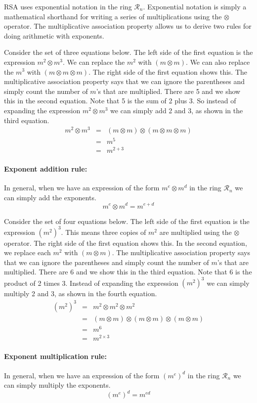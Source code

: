 
RSA uses exponential notation in the ring $\mathcal{R}_n$.
Exponential notation is simply a mathematical shorthand for writing 
a series of multiplications using the $\otimes$ operator.
The multiplicative association property allows us to derive 
two rules for doing arithmetic with exponents.

Consider the set of three equations below.
The left side of the first equation is the expression $m^2 \otimes m^3$.
We can replace the $m^2$ with $(m \otimes m)$.
We can also replace the $m^3$ with $(m \otimes m \otimes m)$.
The right side of the first equation shows this.
The multiplicative association property says that we can 
ignore the parentheses and simply count the number of $m$'s that are multiplied.
There are 5 and we show this in the second equation.
Note that 5 is the sum of 2 plus 3.
So instead of expanding the expression $m^2 \otimes m^3$
we can simply add 2 and 3, as shown in the third equation.
\begin{eqnarray*}
  m^2 \otimes m^3 &=&  (m \otimes m) \otimes (m \otimes m \otimes m)  \\
  &=&  m^5  \\
  &=&  m^{2 + 3}
\end{eqnarray*}

\paragraph{Exponent addition rule:}  In general, when we have an expression of the form 
$m^e \otimes m^d$ in the ring $\mathcal{R}_n$ we can simply add the exponents.
\[  m^e \otimes m^d  =  m^{e + d}  \]

Consider the set of four equations below.
The left side of the first equation is the expression $(m^2)^3$.
This means three copies of $m^2$ are multiplied using the $\otimes$ operator.
The right side of the first equation shows this.
In the second equation, we replace each $m^2$ with $(m \otimes m)$.
The multiplicative association property says that we can 
ignore the parentheses and simply count the number of $m$'s that are multiplied.
There are 6 and we show this in the third equation.
Note that 6 is the product of 2 times 3.
Instead of expanding the expression $(m^2)^3$
we can simply multiply 2 and 3, as shown in the fourth equation.
\begin{eqnarray*}
  (m^2)^3  &=&  m^2 \otimes m^2 \otimes m^2  \\
  &=&  (m \otimes m) \otimes (m \otimes m) \otimes (m \otimes m)  \\
  &=&  m^6 \\
  &=&  m^{2 \times 3}
\end{eqnarray*}

\paragraph{Exponent multiplication rule:}  In general, when we have an expression of the form 
$(m^e)^d$ in the ring $\mathcal{R}_n$ we can simply multiply the exponents.
\begin{equation} \label{eq:expo-mult}
  (m^e)^d  =  m^{ed} 
\end{equation}

